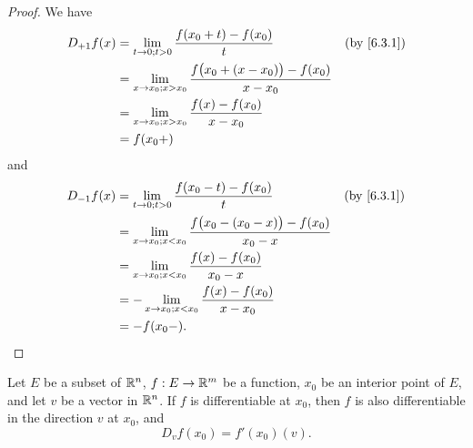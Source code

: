 \begin{proof}
  We have
  \begin{align*}
    D_{+1} f(x) & = \lim_{t \to 0 ; t > 0} \frac{f(x_0 + t) - f(x_0)}{t}                           & \text{(by \cref{6.3.1})} \\
                & = \lim_{x \to x_0 ; x > x_0} \frac{f\big(x_0 + (x - x_0)\big) - f(x_0)}{x - x_0}                            \\
                & = \lim_{x \to x_0 ; x > x_0} \frac{f(x) - f(x_0)}{x - x_0}                                                  \\
                & = f(x_0+)
  \end{align*}
  and
  \begin{align*}
    D_{-1} f(x) & = \lim_{t \to 0 ; t > 0} \frac{f(x_0 - t) - f(x_0)}{t}                           & \text{(by \cref{6.3.1})} \\
                & = \lim_{x \to x_0 ; x < x_0} \frac{f\big(x_0 - (x_0 - x)\big) - f(x_0)}{x_0 - x}                            \\
                & = \lim_{x \to x_0 ; x < x_0} \frac{f(x) - f(x_0)}{x_0 - x}                                                  \\
                & = -\lim_{x \to x_0 ; x < x_0} \frac{f(x) - f(x_0)}{x - x_0}                                                 \\
                & = -f(x_0-).
  \end{align*}
\end{proof}

\setcounter{thm}{4}
\begin{lem}\label{6.3.5}
  Let \(E\) be a subset of \(\mathbb{R}^n\), \(f : E \to \mathbb{R}^m\) be a function, \(x_0\) be an interior point of \(E\), and let \(v\) be a vector in \(\mathbb{R}^n\).
  If \(f\) is differentiable at \(x_0\), then \(f\) is also differentiable in the direction \(v\) at \(x_0\), and
  \[
    D_v f(x_0) = f'(x_0)(v).
  \]
\end{lem}

